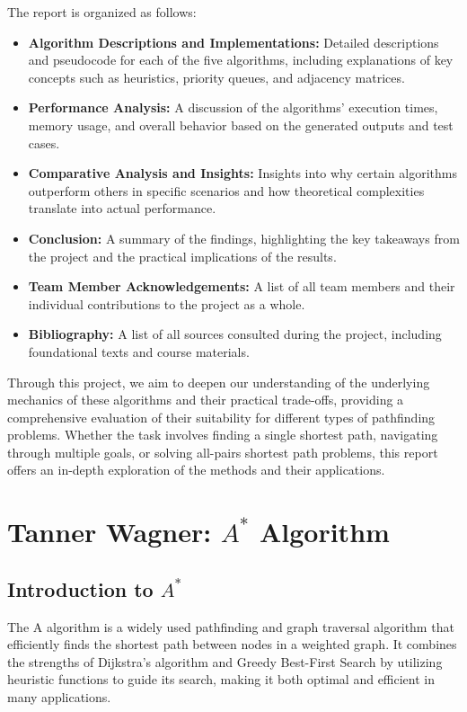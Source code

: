 \documentclass[12pt]{article}
\begin{document}
\noindent The report is organized as follows:
\begin{itemize}
    \item \textbf{Algorithm Descriptions and Implementations:} Detailed descriptions and pseudocode for each of the five algorithms, including explanations of key concepts such as heuristics, priority queues, and adjacency matrices.
    \item \textbf{Performance Analysis:} A discussion of the algorithms' execution times, memory usage, and overall behavior based on the generated outputs and test cases.
    \item \textbf{Comparative Analysis and Insights:} Insights into why certain algorithms outperform others in specific scenarios and how theoretical complexities translate into actual performance.
    \item \textbf{Conclusion:} A summary of the findings, highlighting the key takeaways from the project and the practical implications of the results.
    \item \textbf{Team Member Acknowledgements:} A list of all team members and their individual contributions to the project as a whole.
    \item \textbf{Bibliography:} A list of all sources consulted during the project, including foundational texts and course materials.
\end{itemize}

\noindent Through this project, we aim to deepen our understanding of the underlying mechanics of these algorithms and their practical trade-offs, providing a comprehensive evaluation of their suitability for different types of pathfinding problems. Whether the task involves finding a single shortest path, navigating through multiple goals, or solving all-pairs shortest path problems, this report offers an in-depth exploration of the methods and their applications.
\newpage














\section{Tanner Wagner: $A^*$ Algorithm}

\subsection{Introduction to $A^*$}
The A\* algorithm is a widely used pathfinding and graph traversal algorithm that efficiently finds the shortest path between nodes in a weighted graph. It combines the strengths of Dijkstra's algorithm and Greedy Best-First Search by utilizing heuristic functions to guide its search, making it both optimal and efficient in many applications.
\end{document}
